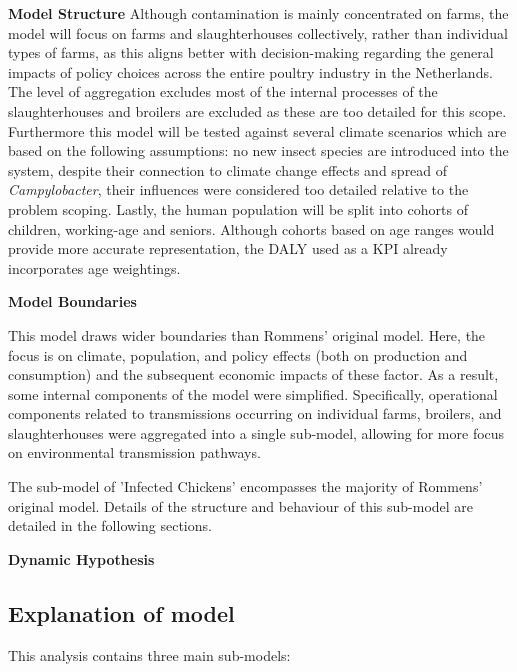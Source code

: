 \textbf{Model Structure}
Although contamination is mainly concentrated on farms, the model will focus on farms and slaughterhouses collectively, rather than individual types of farms, as this aligns better with decision-making regarding the general impacts of policy choices across the entire poultry industry in the Netherlands. The level of aggregation excludes most of the internal processes of the slaughterhouses and broilers are excluded as these are too detailed for this scope. Furthermore this model will be tested against several climate scenarios which are based on the following assumptions: no new insect species are introduced into the system, despite their connection to climate change effects and spread of \textit{Campylobacter}, their influences were considered too detailed relative to the problem scoping. 
Lastly, the human population will be split into cohorts of children, working-age and seniors. Although cohorts based on age ranges would provide more accurate representation, the DALY used as a KPI already incorporates age weightings. %


\textbf{Model Boundaries}

This model draws wider boundaries than Rommens' original model. Here, the focus is on climate, population, and policy effects (both on production and consumption) and the subsequent economic impacts of these factor. As a result, some internal components of the model were simplified. Specifically, operational components related to transmissions occurring on individual farms, broilers, and slaughterhouses were aggregated into a single sub-model, allowing for more focus on environmental transmission pathways.

The sub-model of 'Infected Chickens' encompasses the majority of Rommens' original model. Details of the structure and behaviour of this sub-model are detailed in the following sections. 

\textbf{Dynamic Hypothesis}

\subsection{Explanation of model}
   
This analysis contains three main sub-models:

